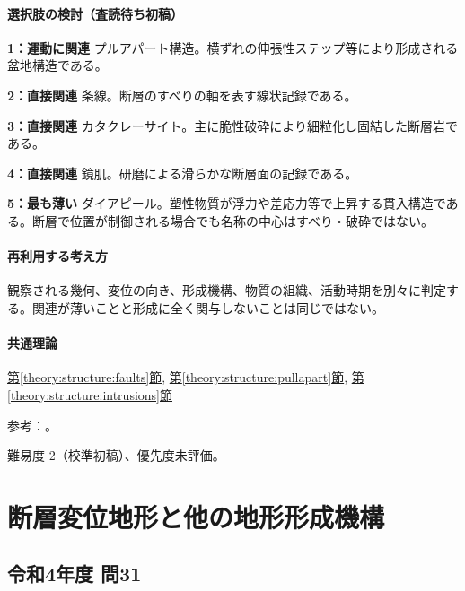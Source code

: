 \paragraph{選択肢の検討（査読待ち初稿）}\mbox{}\par

\noindent\textbf{1：運動に関連} プルアパート構造。横ずれの伸張性ステップ等により形成される盆地構造である。\par

\noindent\textbf{2：直接関連} 条線。断層のすべりの軸を表す線状記録である。\par

\noindent\textbf{3：直接関連} カタクレーサイト。主に脆性破砕により細粒化し固結した断層岩である。\par

\noindent\textbf{4：直接関連} 鏡肌。研磨による滑らかな断層面の記録である。\par

\noindent\textbf{5：最も薄い} ダイアピール。塑性物質が浮力や差応力等で上昇する貫入構造である。断層で位置が制御される場合でも名称の中心はすべり・破砕ではない。\par

\paragraph{再利用する考え方} 観察される幾何、変位の向き、形成機構、物質の組織、活動時期を別々に判定する。関連が薄いことと形成に全く関与しないことは同じではない。

\paragraph{共通理論} \hyperref[theory:structure:faults]{第\ref*{theory:structure:faults}節}, \hyperref[theory:structure:pullapart]{第\ref*{theory:structure:pullapart}節}, \hyperref[theory:structure:intrusions]{第\ref*{theory:structure:intrusions}節}

\par 参考：\cite{str_faultrocks,str_diapir}。

\par 難易度 2（校準初稿）、優先度未評価。

\section{断層変位地形と他の地形形成機構}

\subsection{令和4年度 問31}
\label{q:r04-reg-applied-31}

